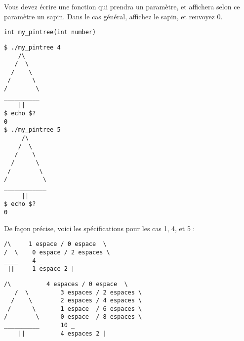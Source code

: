 

\vspace*{0.7cm}

\noindent {}

\bigskip

\noindent Vous devez écrire une fonction qui prendra un paramètre, et affichera selon ce paramètre un sapin.
\noindent Dans le cas général, affichez le sapin, et renvoyez 0.

\bigskip

\lstset{language=C}
\begin{lstlisting}[frame=single,title={Prototype de la fonction}]
int my_pintree(int number)
\end{lstlisting}


\vfillFirst

\lstset{language=sh}
\begin{lstlisting}[frame=single,title={Cas général}]
$ ./my_pintree 4
    /\
   /  \
  /    \
 /      \
/        \
__________
    ||
$ echo $?
0
$ ./my_pintree 5
     /\
    /  \
   /    \
  /      \
 /        \
/          \
____________
     ||
$ echo $?
0
\end{lstlisting}


\vfillLast

\clearpage


\noindent De façon précise, voici les spécifications pour les cas 1, 4, et 5 :

\bigskip

\hspace*{-\parindent} %
\begin{minipage}{15.85cm} %
\lstset{language=sh}
\begin{lstlisting}[frame=single,title={Cas général 1}]
 /\     1 espace / 0 espace  \
/  \    0 espace / 2 espaces \
____    4 _
 ||     1 espace 2 |
\end{lstlisting}
\end{minipage} %

\hspace*{-\parindent} %
\begin{minipage}{15.85cm} %
\lstset{language=sh}
\begin{lstlisting}[frame=single,title={Cas général 4}]
    /\          4 espaces / 0 espace  \
   /  \         3 espaces / 2 espaces \
  /    \        2 espaces / 4 espaces \
 /      \       1 espace  / 6 espaces \
/        \      0 espace  / 8 espaces \
__________      10 _
    ||          4 espaces 2 |
\end{lstlisting}
\end{minipage} %

